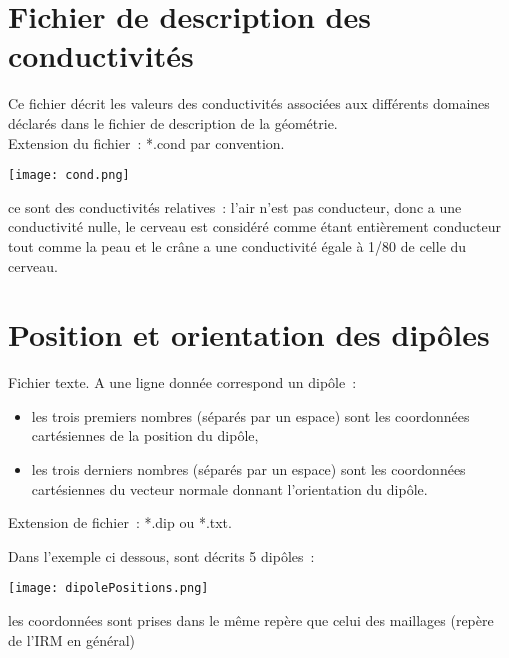 \section{Fichier de description des conductivités}
\label{sect: annexe 2}

\noindent
Ce fichier décrit les valeurs des conductivités associées aux différents domaines déclarés dans le fichier de description de la
géométrie.\\ 
Extension du fichier~: *.cond par convention.\\

\centerline{\texttt{[image: cond.png]}}

\begin{note}
    ce sont des conductivités relatives~: l'air n'est pas conducteur, donc a une conductivité nulle, le cerveau est considéré
    comme étant entièrement conducteur tout comme la peau et le crâne a une conductivité égale à 1/80 de celle du cerveau.
\end{note}

\section{Position et orientation des dipôles}
\label{sect: annexe 3}

\noindent
Fichier texte. A une ligne donnée correspond un dipôle~: 
\begin{itemize}
    \item les trois premiers nombres (séparés par un espace) sont les coordonnées cartésiennes de la position du dipôle,
    \item les trois derniers nombres (séparés par un espace) sont les coordonnées cartésiennes du vecteur normale donnant
           l'orientation du dipôle.
\end{itemize}
Extension de fichier~: *.dip ou *.txt.

\medskip

\noindent
Dans l'exemple ci dessous, sont décrits 5 dipôles~:

\centerline{\texttt{[image: dipolePositions.png]}}

\begin{note}
    les coordonnées sont prises dans le même repère que celui des maillages (repère de l'IRM en général)
\end{note}

